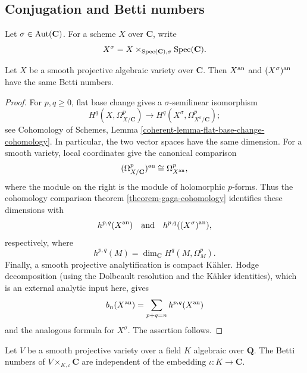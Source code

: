 \subsection{Conjugation and Betti numbers}
\label{subsection-gaga-betti-numbers}

Let $\sigma\in\mathop{\rm Aut}(\mathbf C)$. For a scheme $X$ over
$\mathbf C$, write
$$
X^\sigma=X\times_{\mathop{\rm Spec}(\mathbf C),\sigma}
\mathop{\rm Spec}(\mathbf C).
$$

\begin{proposition}
\label{proposition-conjugate-smooth-projective-betti-numbers}
\begin{reference}
\cite[\S 4, no. 18, Proposition 12]{GAGA}
\end{reference}
Let $X$ be a smooth projective algebraic variety over $\mathbf C$. Then $X^{\rm an}$
and $(X^\sigma)^{\rm an}$ have the same Betti numbers.
\end{proposition}

\begin{proof}
For $p,q\geq 0$, flat base change gives a $\sigma$-semilinear
isomorphism
$$
H^q(X,\Omega^p_{X/\mathbf C})
\longrightarrow
H^q(X^\sigma,\Omega^p_{X^\sigma/\mathbf C});
$$
see Cohomology of Schemes, Lemma
\ref{coherent-lemma-flat-base-change-cohomology}. In particular, the two
vector spaces have the same dimension. For a smooth variety, local
coordinates give the canonical comparison
$$
(\Omega^p_{X/\mathbf C})^{\rm an}
\cong \Omega^p_{X^{\rm an}},
$$
where the module on the right is the module of holomorphic $p$-forms. Thus
the cohomology comparison theorem \ref{theorem-gaga-cohomology} identifies
these dimensions with
$$
h^{p,q}(X^{\rm an})
\quad\hbox{and}\quad
h^{p,q}((X^\sigma)^{\rm an}),
$$
respectively, where
$$
h^{p,q}(M)=\dim_{\mathbf C}H^q(M,\Omega^p_M).
$$
Finally, a smooth projective analytification is compact K\"ahler. Hodge
decomposition (using the Dolbeault resolution and the K\"ahler identities),
which is an external analytic input here, gives
$$
b_n(X^{\rm an})=\sum_{p+q=n}h^{p,q}(X^{\rm an})
$$
and the analogous formula for $X^\sigma$. The assertion follows.
\end{proof}

\begin{proposition}[Corollary]
\label{corollary-number-field-embeddings-betti-numbers}
\begin{reference}
\cite[\S 4, no. 18, corollary to Proposition 12]{GAGA}
\end{reference}
Let $V$ be a smooth projective variety over a field $K$ algebraic over
$\mathbf Q$. The Betti
numbers of $V\times_{K,\iota}\mathbf C$ are independent of the embedding
$\iota:K\longrightarrow\mathbf C$.
\end{proposition}

